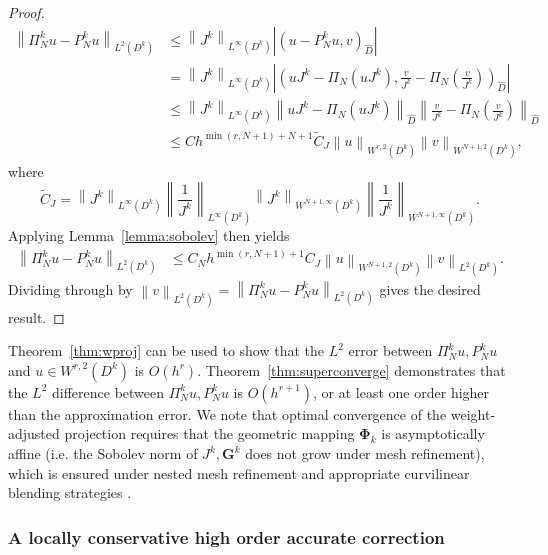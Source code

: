 \documentclass[preprint,10pt]{article}
\theoremstyle{definition}
\theoremstyle{lemma}
\theoremstyle{theorem}
\theoremstyle{assumption}
\renewcommand{\hat}{\widehat}
\renewcommand{\tilde}{\widetilde}
\newcommand{\nor}[1]{\left\| #1 \right\|}
\newcommand{\LRp}[1]{\left( #1 \right)}
\newcommand{\LRb}[1]{\left| #1 \right|}
\begin{document}
{\begin{proof}
\begin{align*}
\nor{\Pi^k_Nu-P^k_Nu}_{L^2\LRp{D^k}} &\leq \nor{J^k}_{L^{\infty}\LRp{D^k}}\LRb{\LRp{u-P_N^ku,v}_{\hat{D}}}\\
&= \nor{J^k}_{L^{\infty}\LRp{D^k}}\LRb{\LRp{uJ^k - \Pi_N\LRp{uJ^k},\frac{v}{J^k}-\Pi_N\LRp{\frac{v}{J^k}}}_{\hat{D}}} \\
&\leq \nor{J^k}_{L^{\infty}\LRp{D^k}}\nor{uJ^k - \Pi_N\LRp{uJ^k}}_{\hat{D}}\nor{\frac{v}{J^k}-\Pi_N\LRp{\frac{v}{J^k}}}_{\hat{D}}\\
&\leq C h^{\min\LRp{r,N+1}+N+1} \tilde{C}_J \nor{u}_{W^{r,2}\LRp{D^k}} \nor{v}_{W^{N+1,2}\LRp{D^k}},
\end{align*}
where 
\[
\tilde{C}_J = \nor{J^k}_{L^{\infty}\LRp{D^k}}\nor{\frac{1}{J^k}}_{L^{\infty}\LRp{D^k}} \nor{J^k}_{W^{N+1,\infty}\LRp{D^k}}\nor{\frac{1}{J^k}}_{W^{N+1,\infty}\LRp{D^k}}.
\]
Applying Lemma~\ref{lemma:sobolev} then yields
\begin{align*}
\nor{\Pi^k_Nu-P^k_Nu}_{L^2\LRp{D^k}}&\leq C_N h^{\min\LRp{r,N+1}+1} C_J \nor{u}_{W^{N+1,2}\LRp{D^k}} \nor{v}_{L^2\LRp{D^k}}.
\end{align*}
Dividing through by $\nor{v}_{L^2\LRp{D^k}} = \nor{\Pi^k_N u - P_N^k  u}_{L^2\LRp{D^k}}$ gives the desired result.  %
\end{proof}
Theorem~\ref{thm:wproj} can be used to show that the $L^2$ error between $\Pi^k_N u, P^k_N u$ and $u \in W^{r,2}\LRp{D^k}$ is $O(h^r)$.  Theorem~\ref{thm:superconverge} demonstrates that the $L^2$ difference between $\Pi^k_N u, P^k_N u$ is $O(h^{r+1})$, or at least one order higher than the approximation error.  We note that optimal convergence of the weight-adjusted projection requires that the geometric mapping $\bm{\Phi}_k$ is asymptotically affine (i.e. the Sobolev norm of $J^k, \bm{G}^k$ does not grow under mesh refinement), which is ensured under nested mesh refinement and appropriate curvilinear blending strategies \cite{lenoir1986optimal, warburton2013low, chan2016weight2}.  

\subsubsection{A locally conservative high order accurate correction}

}
\end{document}
